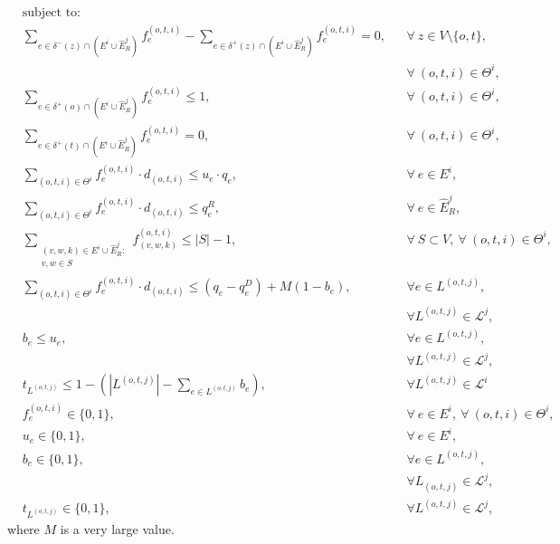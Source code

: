 \documentclass[review]{elsarticle}
\begin{document}
    \begin{align}
        & \text{subject to:}       && \nonumber\\
& \sum_{e \in \delta^-(z)\cap (E^i\cup \widehat{E}_R^j)} f_e^{(o,t,i)}-\sum_{e \in \delta^+(z)\cap (E^i\cup \widehat{E}_R^j)} f_{e}^{(o,t,i)}  = 0,                                   && \forall\ z\in V\setminus\{o,t\},\nonumber\\[-1em]
& && \forall\ (o,t,i)\in\Theta^i,  \label{eq:IterativeB}\\[1em]
& \sum_{e \in \delta^+(o)\cap (E^i\cup \widehat{E}_R^j)} f_e^{(o,t,i)}  \leq 1, && \forall\ (o,t,i)\in \Theta^i, \label{eq:IterativeC} \\
& \sum_{e \in \delta^+(t)\cap (E^i\cup \widehat{E}_R^j)} f_e^{(o,t,i)}  = 0,  && \forall\ (o,t,i)\in \Theta^i, \label{eq:IterativeD} \\
& \sum_{(o,t,i) \in \Theta^i} f_e^{(o,t,i)}\cdot d_{(o,t,i)} \leq u_e\cdot q_e, && \forall\ e \in E^i, \label{eq:IterativeE}  \\
& \sum_{(o,t,i) \in \Theta^i} f_e^{(o,t,i)}\cdot d_{(o,t,i)} \leq  q_e^R, && \forall\ e \in \widehat{E}_R^j,\label{eq:IterativeF}  \\
& \sum_{\substack{(v,w,k) \in E^i\cup \widehat{E}_R^j\colon \\ v,w \in S}}  f_{(v,w,k)}^{(o,t,i)}  \leq |S| -1, && \forall\ S \subset V,\ \forall\ (o,t,i) \in \Theta^i, \label{eq:IterativeG}\\
&\sum_{(o,t,i)\in \Theta^i} f_e^{(o,t,i)}\cdot d_{(o,t,i)} \leq (q_e - q_e^D) +M(1-b_e),\quad && \forall e \in L^{(o,t,j)},\nonumber\\[-5pt]
& && \forall L^{(o,t,j)} \in \mathcal{L}^j, \label{eq:IterativeH}\\[5pt]
&b_e \leq u_e, && \forall e\in L^{(o,t,j)},\nonumber\\[-5pt]
& && \forall L^{(o,t,j)} \in \mathcal{L}^j, \label{eq:IterativeI}\\[5pt]
& t_{L^{(o,t,j)}} \leq 1 -  (|L^{(o,t,j)}|-\sum_{e \in L^{(o,t,j)}} b_e), && \forall L^{(o,t,j)} \in \mathcal{L}^i \label{eq:IterativeJ}\\
& f_e^{(o,t,i)}  \in \{0,1\}, && \forall\ e \in E^i,\ \forall\ (o,t,i) \in \Theta^i, \label{eq:IterativeK} \\
&  u_e   \in \{0,1\},   && \forall\ e \in E^i,  \label{eq:IterativeL}\\
& b_e \in \{0,1\}, && \forall e \in L^{(o,t,j)},\nonumber\\[-5pt]
& && \forall L_{(o,t,j)}\in \mathcal{L}^j,\label{eq:IterativeM}\\[5pt]
& t_{L^{(o,t,j)}} \in \{0,1\}, && \forall L^{(o,t,j)} \in \mathcal{L}^j, \label{eq:IterativeN}
    \end{align}
where $M$ is a very large value.
\end{document}
